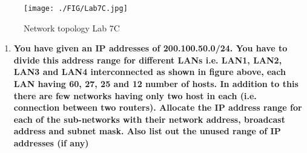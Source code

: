 \documentclass[a4paper,11pt]{article}
\begin{document}
\begin{figure}[H]
    \centering
    \texttt{[image: ./FIG/Lab7C.jpg]}
    \caption{Network topology Lab 7C}
\end{figure}
\begin{enumerate}


    \item \textbf{You have given an IP addresses of 200.100.50.0/24. You have to divide this address range
              for different LANs i.e. LAN1, LAN2, LAN3 and LAN4 interconnected as shown in figure
              above, each LAN having 60, 27, 25 and 12 number of hosts. In addition to this there are
              few networks having only two host in each (i.e. connection between two routers). Allocate
              the IP address range for each of the sub-networks with their network address, broadcast
              address and subnet mask. Also list out the unused range of IP addresses (if any)}




\end{enumerate}
\end{document}
